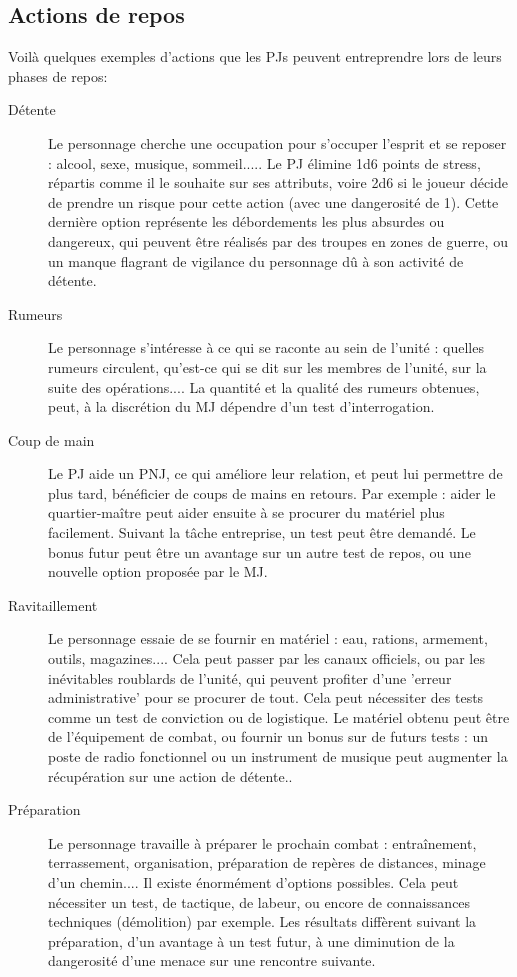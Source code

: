 \documentclass{report}
\begin{document}
\begin{multicols}{2}
\subsection{Actions de repos}
Voilà quelques exemples d'actions que les PJs peuvent entreprendre lors de leurs phases de repos:
\begin{description}
    \item[Détente] Le personnage cherche une occupation pour s'occuper l'esprit et se reposer : alcool, sexe, musique, sommeil..... Le PJ élimine 1d6 points de stress, répartis comme il le souhaite sur ses attributs, voire 2d6 si le joueur décide de prendre un risque pour cette action (avec une dangerosité de 1). Cette dernière option représente les débordements les plus absurdes ou dangereux, qui peuvent être réalisés par des troupes en zones de guerre, ou un manque flagrant de vigilance du personnage dû à son activité de détente. %
    \item[Rumeurs] Le personnage s'intéresse à ce qui se raconte au sein de l'unité : quelles rumeurs circulent, qu'est-ce qui se dit sur les membres de l'unité, sur la suite des opérations.... La quantité et la qualité des rumeurs obtenues, peut, à la discrétion du MJ dépendre d'un test d'interrogation.
    \item[Coup de main] Le PJ aide un PNJ, ce qui améliore leur relation, et peut lui permettre de plus tard, bénéficier de coups de mains en retours. Par exemple : aider le quartier-maître peut aider ensuite à se procurer du matériel plus facilement. Suivant la tâche entreprise, un test peut être demandé. Le bonus futur peut être un avantage sur un autre test de repos, ou une nouvelle option proposée par le MJ.
    \item[Ravitaillement] Le personnage essaie de se fournir en matériel : eau, rations, armement, outils, magazines.... Cela peut passer par les canaux officiels, ou par les inévitables roublards de l'unité, qui peuvent profiter d'une 'erreur administrative' pour se procurer de tout. Cela peut nécessiter des tests comme un test de conviction ou de logistique. Le matériel obtenu peut être de l'équipement de combat, ou fournir un bonus sur de futurs tests : un poste de radio fonctionnel ou un instrument de musique peut augmenter la récupération sur une action de détente..
    \item[Préparation] Le personnage travaille à préparer le prochain combat : entraînement, terrassement, organisation, préparation de repères de distances, minage d'un chemin.... Il existe énormément d'options possibles. Cela peut nécessiter un test, de tactique, de labeur, ou encore de connaissances techniques (démolition) par exemple. Les résultats diffèrent suivant la préparation, d'un avantage à un test futur, à une diminution de la dangerosité d'une menace sur une rencontre suivante.

\end{description}
\end{multicols}
\end{document}
